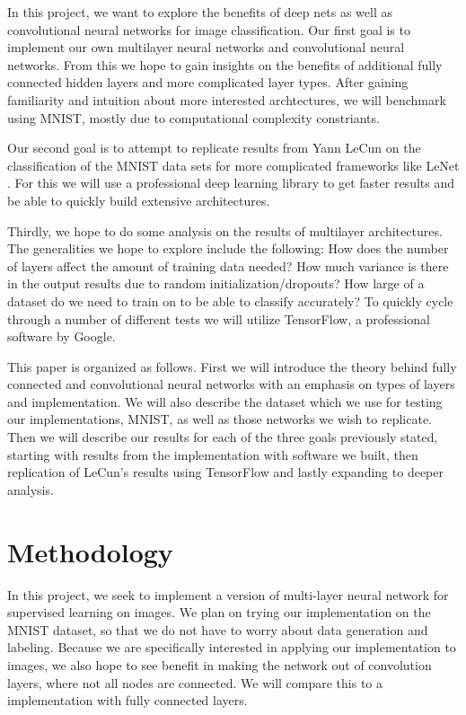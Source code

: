 \documentclass[12pt, twocolumn]{article}
\begin{document}
In this project, we want to explore the benefits of deep nets as well as convolutional neural networks for image classification.  Our first goal is to implement our own multilayer neural networks and convolutional neural networks. From this we hope to gain insights on the benefits of additional fully connected hidden layers and more complicated layer types. After gaining familiarity and intuition about more interested archtectures, we will benchmark using MNIST, mostly due to computational complexity constriants.

Our second goal is to attempt to replicate results from Yann LeCun on the classification of the MNIST data sets for more complicated frameworks like LeNet \cite{LeCun1998}. For this we will use a professional deep learning library to get faster results and be able to quickly build extensive architectures. 

Thirdly, we hope to do some analysis on the results of multilayer architectures. The generalities we hope to explore include the following: How does the number of layers affect the amount of training data needed?  How much variance is there in the output results due to random initialization/dropouts? How large of a dataset do we need to train on to be able to classify accurately?  To quickly cycle through a number of different tests we will utilize TensorFlow, a professional software by Google.

This paper is organized as follows. First we will introduce the theory behind fully connected and convolutional neural networks with an emphasis on types of layers and implementation. We will also describe the dataset which we use for testing our implementations, MNIST, as well as those networks we wish to replicate.  Then we will describe our results for each of the three goals previously stated, starting with results from the implementation with software we built, then replication of LeCun's results using TensorFlow and lastly expanding to deeper analysis. 

\section{Methodology}
In this project, we seek to implement a version of multi-layer neural network for supervised learning on images. We plan on trying our implementation on the MNIST dataset, so that we do not have to worry about data generation and labeling. Because we are specifically interested in applying our implementation to images, we also hope to see benefit in making the network out of convolution layers, where not all nodes are connected. We will compare this to a implementation with fully connected layers.
\end{document}
